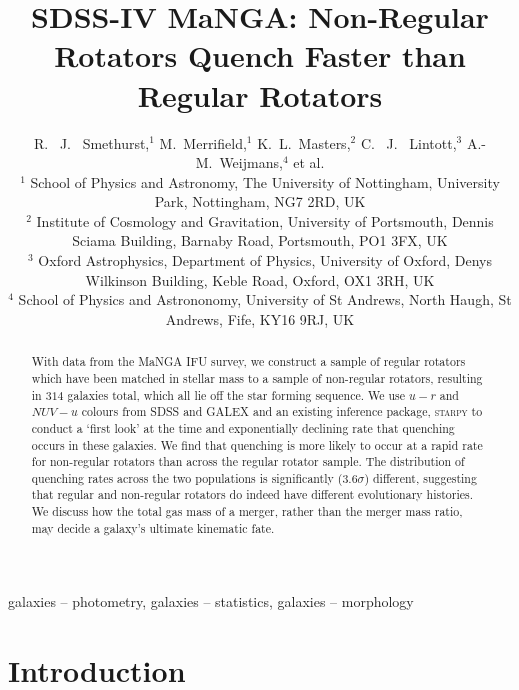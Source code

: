 \documentclass[useAMS,usenatbib]{mn2e}
\begin{document}
\title[Quenching Histories of Regular and Non-Regular Rotators]{SDSS-IV MaNGA: Non-Regular Rotators Quench Faster than Regular Rotators}
\author[Smethurst et al. 2017]{R. ~J. ~Smethurst,$^{1}$ M.~Merrifield,$^{1}$ K.~L.~Masters,$^{2}$  C. ~J. ~Lintott,$^{3}$ \newauthor A.-M.~Weijmans,$^{4}$ et al.
\\ $^1$ School of Physics and Astronomy, The University of Nottingham, University Park, Nottingham, NG7 2RD, UK
\\ $^2$ Institute of Cosmology and Gravitation, University of Portsmouth, Dennis Sciama Building, Barnaby Road, Portsmouth, PO1 3FX, UK 
\\ $^3$ Oxford Astrophysics, Department of Physics, University of Oxford, Denys Wilkinson Building, Keble Road, Oxford, OX1 3RH, UK
\\ $^4$ School of Physics and Astrononomy, University of St Andrews, North Haugh, St Andrews, Fife, KY16 9RJ, UK
}

\maketitle

\begin{abstract}
With data from the MaNGA IFU survey, we construct a sample of regular rotators which have been matched in stellar mass to a sample of non-regular rotators, resulting in $314$ galaxies total, which all lie off the star forming sequence. We use $u-r$ and $NUV-u$ colours from SDSS and GALEX and an existing inference package, \textsc{starpy} to conduct a `first look' at the time and exponentially declining rate that quenching occurs in these galaxies. We find that quenching is more likely to occur at a rapid rate for non-regular rotators than across the regular rotator sample. The distribution of quenching rates across the two populations is significantly ($3.6\sigma$) different, suggesting that regular and non-regular rotators do indeed have different evolutionary histories. We discuss how the total gas mass of a merger, rather than the merger mass ratio, may decide a galaxy's ultimate kinematic fate. 
\end{abstract}

\begin{keywords}
galaxies -- photometry, galaxies -- statistics, galaxies -- morphology
\end{keywords}

\section{Introduction}\label{sec:intro}
\end{document}

